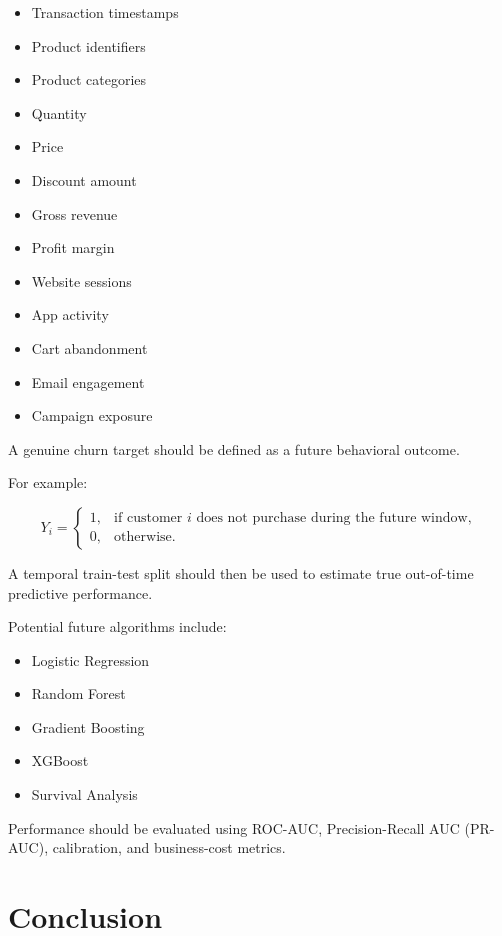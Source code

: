 \documentclass[11pt,a4paper]{article}
\begin{document}
\begin{itemize}
    \item Transaction timestamps
    \item Product identifiers
    \item Product categories
    \item Quantity
    \item Price
    \item Discount amount
    \item Gross revenue
    \item Profit margin
    \item Website sessions
    \item App activity
    \item Cart abandonment
    \item Email engagement
    \item Campaign exposure
\end{itemize}

A genuine churn target should be defined as a future behavioral outcome.

For example:

\[
Y_i=
\begin{cases}
1, & \text{if customer }i\text{ does not purchase during the future window},\\
0, & \text{otherwise}.
\end{cases}
\]

A temporal train-test split should then be used to estimate true out-of-time predictive performance.

Potential future algorithms include:

\begin{itemize}
    \item Logistic Regression
    \item Random Forest
    \item Gradient Boosting
    \item XGBoost
    \item Survival Analysis
\end{itemize}

Performance should be evaluated using ROC-AUC, Precision-Recall AUC (PR-AUC), calibration, and business-cost metrics.


\section{Conclusion}
\end{document}
